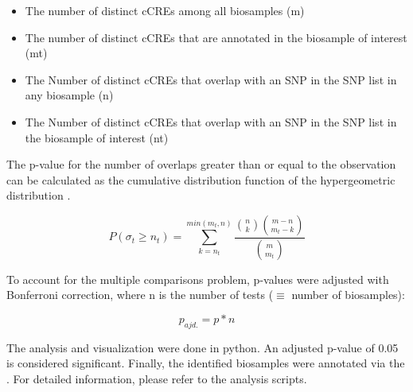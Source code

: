 \begin{itemize}
    \item The number of distinct \acp{cCRE} among all biosamples (m)
    \item The number of distinct \acp{cCRE} that are annotated in the biosample of interest (mt)
    \item The Number of distinct \acp{cCRE} that overlap with an SNP in the SNP list in any biosample (n)
    \item The Number of distinct \acp{cCRE} that overlap with an SNP in the SNP list in the biosample of interest (nt)
\end{itemize}

The p-value for the number of overlaps greater than or equal to the observation can be calculated as the cumulative distribution function of the hypergeometric distribution \cite{}.

$$ P(\sigma_t\geq n_t) = \sum_{k=n_t}^{min(m_t, n)} \frac{\binom{n}{k}\binom{m-n}{m_t-k}}{\binom{m}{m_t}} $$

To account for the multiple comparisons problem, p-values were adjusted with Bonferroni correction, where n is the number of tests ($\equiv$ number of biosamples):

$$ p_{ajd.} = p*n$$

The analysis and visualization were done in python. An adjusted p-value of 0.05 is considered significant. Finally, the identified biosamples were annotated via the . For detailed information, please refer to the analysis scripts.

